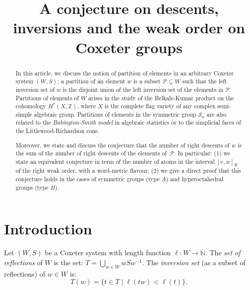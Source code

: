 \documentclass[Unicode]{cedram-alco}
\author[C. Hohlweg]{\firstname{Christophe} \lastname{Hohlweg}}
\author[V. Pons]{\firstname{Viviane} \lastname{Pons}}
\title[A conjecture on descents, inversions and the weak order]{A conjecture on descents, inversions and the weak order on Coxeter groups}
\theoremstyle{definition}
\begin{document}



\begin{abstract} In this article, we discuss the notion of partition of elements in an arbitrary Coxeter system $(W,S)$: a partition of an element $w$ is a subset $\mathcal P\subseteq W$ such that the left inversion set of $w$ is the disjoint union of the left inversion set of the elements in $\mathcal P$. Partitions of elements of $W$ arises in the study of the Belkale-Kumar product on the cohomology $H^*(X,\mathbb Z)$, where $X$ is  the complete flag variety of any complex semi-simple algebraic group. Partitions of elements in the symmetric group $\mathcal S_n$ are also related to the {\em Babington-Smith model} in algebraic statistics or to the simplicial faces of the Littlewood-Richardson cone. 

Moreover, we state and discuss the conjecture that the number of right descents of $w$ is the  sum of the number of right descents of the elements of~$\mathcal P$. In particular: (1) we state an equivalent conjecture in term of the number of atoms  in the interval $[e,w]_R$ of the right weak order, with a word-metric flavour; (2) we give a direct proof that this conjecture holds in the cases of symmetric groups (type $A$) and hyperoctahedral groups (type $B$). 
\end{abstract}

\maketitle


\section{Introduction}   Let $(W,S)$ be a Coxeter system with length function $\ell:W\to \mathbb N$. The {\em set of reflections} of $W$ is the set:
$
T=\bigcup_{w\in W}wSw^{-1}.
$
 The {\em inversion set} (as a subset of reflections) of $w\in W$ is:
 $$
 T(w) = \{t \in T\mid \ell(tw)<\ell(t)\}.
 $$
\end{document}
